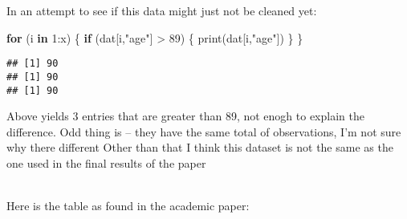 \documentclass[
]{article}
\newenvironment{Shaded}{\begin{snugshade}}{\end{snugshade}}
\newcommand{\AttributeTok}[1]{\textcolor[rgb]{0.77,0.63,0.00}{#1}}
\newcommand{\ControlFlowTok}[1]{\textcolor[rgb]{0.13,0.29,0.53}{\textbf{#1}}}
\newcommand{\DecValTok}[1]{\textcolor[rgb]{0.00,0.00,0.81}{#1}}
\newcommand{\FunctionTok}[1]{\textcolor[rgb]{0.00,0.00,0.00}{#1}}
\newcommand{\NormalTok}[1]{#1}
\newcommand{\OtherTok}[1]{\textcolor[rgb]{0.56,0.35,0.01}{#1}}
\newcommand{\SpecialCharTok}[1]{\textcolor[rgb]{0.00,0.00,0.00}{#1}}
\newcommand{\StringTok}[1]{\textcolor[rgb]{0.31,0.60,0.02}{#1}}
\begin{document}
In an attempt to see if this data might just not be cleaned yet:

\begin{Shaded}
\begin{Highlighting}[]
\ControlFlowTok{for}\NormalTok{ (i }\ControlFlowTok{in} \DecValTok{1}\SpecialCharTok{:}\NormalTok{x) \{}
    \ControlFlowTok{if}\NormalTok{ (dat[i,}\StringTok{"age"}\NormalTok{] }\SpecialCharTok{\textgreater{}} \DecValTok{89}\NormalTok{) \{}
       \FunctionTok{print}\NormalTok{(dat[i,}\StringTok{"age"}\NormalTok{])}
\NormalTok{       \}}
\NormalTok{    \}}
\end{Highlighting}
\end{Shaded}

\begin{verbatim}
## [1] 90
## [1] 90
## [1] 90
\end{verbatim}

Above yields 3 entries that are greater than 89, not enogh to explain
the difference. Odd thing is -- they have the same total of
observations, I'm not sure why there different Other than that I think
this dataset is not the same as the one used in the final results of the
paper\\
\strut \\
Here is the table as found in the academic paper:

\begin{Shaded}
\end{Shaded}
\end{document}
